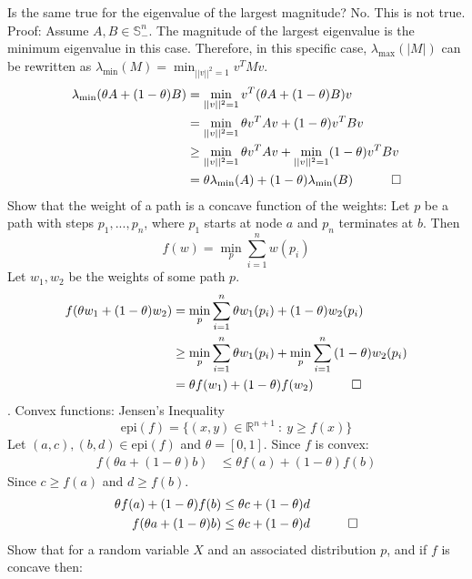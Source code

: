 \documentclass{article}
\begin{document}
Is the same true for the eigenvalue of the largest magnitude? \newline
No. This is not true. Proof:
Assume $A, B \in \mathbb{S}^n_{-}$. The magnitude of the largest eigenvalue is the minimum eigenvalue in this case. Therefore, in this specific case, $\lambda_{\text{max}}(|M|)$ can be rewritten as $\lambda_{\text{min}}(M) = \min_{||v||^2 = 1}{v^TMv}$. 
\begin{align*}
	\lambda_{\text{min}}(\theta A + (1 - \theta)B) &= \min_{||v||^2 = 1}v^T(\theta A + (1 - \theta)B)v \\
	&= \min_{||v||^2 = 1}\theta v^TAv + (1 - \theta)v^TBv \\
	&\geq \min_{||v||^2 = 1}\theta v^TAv  + \min_{||v||^2 = 1}(1 - \theta)v^TBv \\
	&= \theta\lambda_{\text{min}}(A) + (1 - \theta)\lambda_{\text{min}}(B) \quad \qed
\end{align*}
Show that the weight of a path is a concave function of the weights:
Let $p$ be a path with steps $p_1, ..., p_n$, where $p_1$ starts at node $a$ and $p_n$ terminates at $b$. Then
\begin{equation*}
	f(w) = \min_{p}\sum_{i=1}^{n}{w(p_i)}
\end{equation*}
Let $w_1, w_2$ be the weights of some path $p$. 
\begin{align*}
	f(\theta w_1 + (1-\theta)w_2) &=  \min_{p}\sum_{i=1}^{n}{\theta w_1(p_i) + (1 - \theta)w_2(p_i)} \\
	&\geq \min_{p}\sum_{i=1}^{n}{\theta w_1(p_i)}  +  \min_{p}\sum_{i=1}^{n}{(1 - \theta)w_2(p_i)} \\
	&= \theta f(w_1) + (1-\theta)f(w_2) \quad \qed
\end{align*}
\newpage
{}. Convex functions: Jensen's Inequality 
\begin{equation*}
	\text{epi}(f) = \{(x, y) \in \mathbb{R}^{n+1} \ : \ y \geq f(x)\}
\end{equation*}
Let $ (a, c), (b, d) \in \text{epi}(f)$ and $\theta = [0, 1]$. 
Since $f$ is convex:
\begin{align*}
	f(\theta a + (1 - \theta)b) &\leq \theta f(a) + (1 - \theta) f(b)
\end{align*}
Since $ c \geq f(a)$ and $ d \geq f(b) $. 
\begin{align*}
	\theta f(a) + (1 - \theta) f(b) &\leq \theta c + (1 - \theta)d \\
	f(\theta a + (1 - \theta)b) &\leq \theta c + (1 - \theta)d \quad \qed
\end{align*}
Show that for a random variable $X$ and an associated distribution $p$, and if $f$ is concave then:
\end{document}
